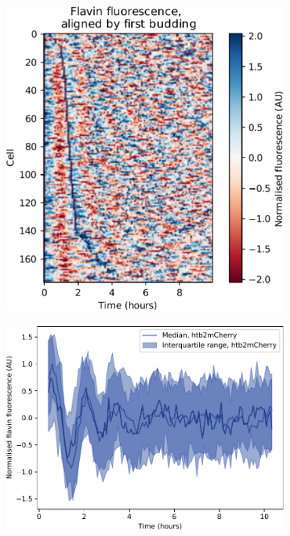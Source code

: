 \begin{figure}
  \centering
  \begin{subfigure}[htpb]{0.45\textwidth}
   \centering
   \includegraphics[width=\textwidth]{heatmap_edit.pdf}
   \caption{
   }
   \label{fig:biology-highglc-sync-heatmap}
  \end{subfigure}%
  \begin{subfigure}[htpb]{0.45\textwidth}
   \centering
   \includegraphics[width=\textwidth]{htb2mCherry_highglcreps_6.pdf}
   \caption{
   }
   \label{fig:biology-highglc-sync-median}
  \end{subfigure}


\end{figure}
